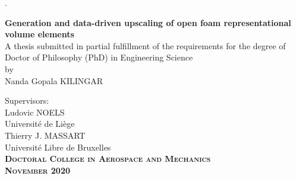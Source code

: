 \documentclass[a4paper,french,12pt]{article}
\newcommand{\thesistitle}{Generation and data-driven upscaling of open foam representational volume elements}
\begin{document}
 \BgThispage
.
 \vspace{3cm}
\begin{tcolorbox}
	\color[rgb]{0,0,0}
	\Large{\textbf{\thesistitle}} \\
	\vspace{0.5cm}
	\large{A thesis submitted in partial fulfillment of the requirements for the degree of Doctor of Philosophy (PhD) in Engineering Science\\
	\vspace{1.5cm}
	by\\}
	\vspace{0.25cm}
	\large{Nanda Gopala KILINGAR}
\end{tcolorbox} 
\vspace{13cm}

\begin{tcolorbox}[standard jigsaw, halign=right,opacityback=0,opacityframe=0]
		\color[rgb]{1,1,1}
	{Supervisors:\\
		\vspace{0.5cm}
		{Ludovic NOELS} \\Universit\'e de Li\`ege\\
		\vspace{0.5cm}
		{Thierry J. MASSART} \\Universit\'e Libre de Bruxelles\\
		\vspace{0.75cm}
		\textsc{\textbf{Doctoral College in Aerospace and Mechanics}}\\
		\vspace{0.25cm}
		\textsc{\textbf{November 2020}}
	}
\end{tcolorbox}	
\end{document}

